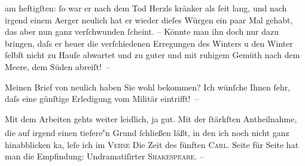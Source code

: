                am heftigſten: ſo war er nach dem Tod Herzls
               kränker als ſeit lang, und nach irgend einem Aerger neulich hat er wieder dieſes
               Würgen ein paar Mal gehabt, das aber nun ganz verſchwunden ſcheint. – Könnte man ihn
               doch nur dazu bringen, daſs er heuer die verſchiedenen Erregungen des Winters \introOben{}u den Winter ſelbſt\introOben{} nicht zu Hauſe abwartet und zu guter
                  \label{T_L01424-2v}\label{T_L01424-2} und mit ruhigem Gemüth
                  {\pb}nach dem Meere, dem Süden abreiſt! –\pend
           
\pstart
           Meinen Brief von neulich haben Sie wohl bekommen? Ich wünſche Ihnen ſehr, daſs eine
               günſtige Erledigung vom Militär eintrifft! –\pend
           
\pstart
           Mit dem Arbeiten gehts weiter leidlich, ja gut. Mit der ſtärkſten Antheilnahme, die
               auf irgend ein\introOben{}en\introOben{} tiefere\substVorne{}\textsuperscript{s}\substDazwischen{}n\substHinten{} Grund ſchließen läßt, in den ich noch nicht ganz hinabblicken ka{\geminationn}, leſe ich im \textsc{Vehse}{ }{\pb}Die Zeit des fünften
                        \textsc{Carl}. Seite für Seite hat man die Empfindung: Undramatiſirter \textsc{Shakespeare}. –\pend
           
